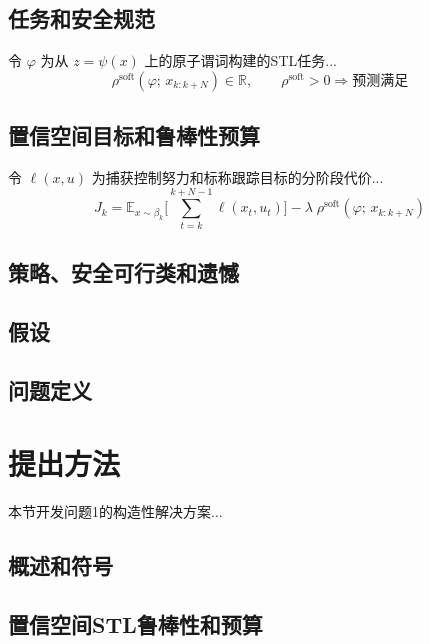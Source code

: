 \documentclass[12pt,a4paper]{ctexart}
\numberwithin{equation}{section}
\begin{document}
\subsection{任务和安全规范}

令 $\varphi$ 为从 $z=\psi(x)$ 上的原子谓词构建的STL任务...
\begin{equation}
    \rho^{\text{soft}}(\varphi;\, x_{k:k+N}) \in \mathbb{R}, \qquad \rho^{\text{soft}}>0 \Rightarrow \text{预测满足}
\end{equation}

\subsection{置信空间目标和鲁棒性预算}

令 $\ell(x,u)$ 为捕获控制努力和标称跟踪目标的分阶段代价...
\begin{equation}
    J_{k} = \mathbb{E}_{x\sim\beta_k}\Bigg[\sum_{t=k}^{k+N-1} \ell(x_t,u_t)\Bigg] - \lambda \; \rho^{\text{soft}}(\varphi;\, x_{k:k+N})
\end{equation}

\subsection{策略、安全可行类和遗憾}

\subsection{假设}

\subsection{问题定义}

\clearpage
\section{提出方法}

本节开发问题1的构造性解决方案...

\subsection{概述和符号}

\subsection{置信空间STL鲁棒性和预算}
\end{document}
